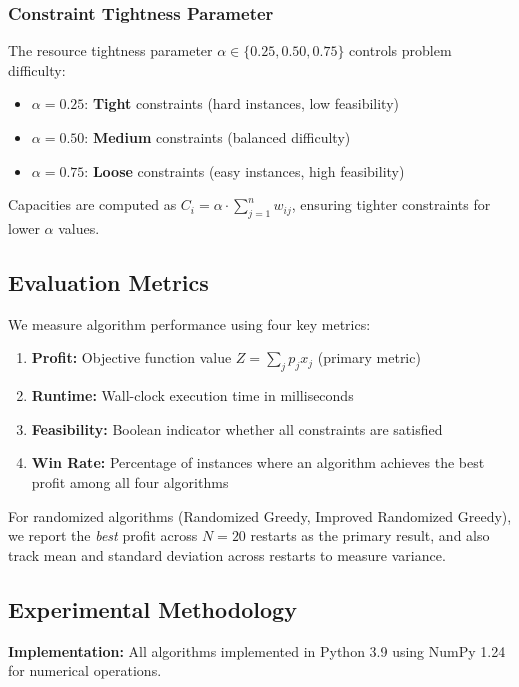 \documentclass[12pt,a4paper]{article}
\begin{document}
\subsubsection{Constraint Tightness Parameter}

The resource tightness parameter $\alpha \in \{0.25, 0.50, 0.75\}$ controls problem difficulty:
\begin{itemize}
    \item $\alpha = 0.25$: \textbf{Tight} constraints (hard instances, low feasibility)
    \item $\alpha = 0.50$: \textbf{Medium} constraints (balanced difficulty)
    \item $\alpha = 0.75$: \textbf{Loose} constraints (easy instances, high feasibility)
\end{itemize}

Capacities are computed as $C_i = \alpha \cdot \sum_{j=1}^{n} w_{ij}$, ensuring tighter constraints for lower $\alpha$ values.

\subsection{Evaluation Metrics}

We measure algorithm performance using four key metrics:

\begin{enumerate}
    \item \textbf{Profit:} Objective function value $Z = \sum_{j} p_j x_j$ (primary metric)
    \item \textbf{Runtime:} Wall-clock execution time in milliseconds
    \item \textbf{Feasibility:} Boolean indicator whether all constraints are satisfied
    \item \textbf{Win Rate:} Percentage of instances where an algorithm achieves the best profit among all four algorithms
\end{enumerate}

For randomized algorithms (Randomized Greedy, Improved Randomized Greedy), we report the \emph{best} profit across $N = 20$ restarts as the primary result, and also track mean and standard deviation across restarts to measure variance.

\subsection{Experimental Methodology}

\textbf{Implementation:} All algorithms implemented in Python 3.9 using NumPy 1.24 for numerical operations.
\end{document}
